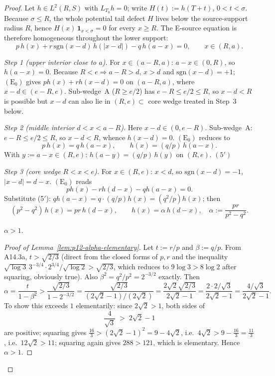 \begin{proof}
Let $h \in L^2(R, S)$ with $L_{T_0} h = 0$; write $H(t) := h(T + t)$,
$0 < t < \sigma$.  Because $\sigma \le R$, the whole potential tail
defect $H$ lives below the source-support radius $R$, hence
$H(x)\,\mathbf 1_{x < \sigma} = 0$ for every $x \ge R$.  The E-source
equation is therefore homogeneous throughout the lower support:
\[
p\, h(x) + r\, \mathrm{sgn}(x - d)\, h(|x - d|) - q\, h(a - x) = 0,
\qquad x \in (R, a).
\tag{E$_0$}
\]

\medskip
\noindent\emph{Step 1 (upper interior close to $a$).}
For $x \in (a - R, a)$: $a - x \in (0, R)$, so $h(a - x) = 0$.  Because
$R < e \Rightarrow a - R > d$, $x > d$ and $\mathrm{sgn}(x - d) = +1$;
$(\text{E}_0)$ gives $p h(x) + r h(x - d) = 0$ on $(a - R, a)$, where
$x - d \in (e - R, e)$.  Sub-wedge~A ($R \ge e/2$) has
$e - R \le e/2 \le R$, so $x - d < R$ is possible but $x - d$ can also
lie in $(R, e) \subset$ core wedge treated in Step~3 below.

\medskip
\noindent\emph{Step 2 (middle interior $d < x < a - R$).}
Here $x - d \in (0, e - R)$.  Sub-wedge~A: $e - R \le e/2 \le R$, so
$x - d < R$, whence $h(x - d) = 0$.  $(\text{E}_0)$ reduces to
\[
p\, h(x) = q\, h(a - x),\qquad h(x) = (q/p)\, h(a - x).
\tag{5}
\]
With $y := a - x \in (R, e)$: $h(a - y) = (q/p)\, h(y)$ on $(R, e)$.
\((\text{5}')\)

\medskip
\noindent\emph{Step 3 (core wedge $R < x < e$).}
For $x \in (R, e)$: $x < d$, so $\mathrm{sgn}(x - d) = -1$,
$|x - d| = d - x$.  $(\text{E}_0)$ reads
\[
p h(x) - r h(d - x) - q h(a - x) = 0.
\tag{E$_0$'}
\]
Substitute (5$'$): $q h(a - x) = q\cdot(q/p) h(x) = (q^2/p) h(x)$; then
\[
(p^2 - q^2)\, h(x) = p r\, h(d - x),
\qquad h(x) = \alpha\, h(d - x),
\quad \alpha := \frac{p r}{p^2 - q^2}.
\tag{6}
\]

\begin{lemma}\label{lem:p12-alpha-elementary}
$\alpha > 1$.
\end{lemma}
\begin{proof}[Proof of Lemma~\ref{lem:p12-alpha-elementary}]
Let $t := r/p$ and $\beta := q/p$.  From A14.3a, $t > \sqrt{2/3}$
(direct from the closed forms of $p, r$ and the inequality
$\sqrt{\log 3}\, 3^{-3/4} \cdot 2^{3/4}/\sqrt{\log 2} > \sqrt{2/3}$,
which reduces to $9\log 3 > 8\log 2$ after squaring, obviously true).
Also $\beta^2 = q^2/p^2 = 2^{-3/2}$ exactly.  Then
$$\alpha = \frac{t}{1 - \beta^2} > \frac{\sqrt{2/3}}{1 - 2^{-3/2}}
 = \frac{\sqrt{2/3}}{(2\sqrt 2 - 1)/(2\sqrt 2)}
 = \frac{2\sqrt{2}\sqrt{2/3}}{2\sqrt 2 - 1}
 = \frac{2\cdot 2/\sqrt 3}{2\sqrt 2 - 1}
 = \frac{4/\sqrt 3}{2\sqrt 2 - 1}.$$
To show this exceeds $1$ elementarily: since $2\sqrt 2 > 1$, both
sides of
$$
\frac{4}{\sqrt 3} \;>\; 2\sqrt 2 - 1
$$
are positive; squaring gives
$\tfrac{16}{3} > (2\sqrt 2 - 1)^{2} = 9 - 4\sqrt 2$, i.e.\
$4\sqrt 2 > 9 - \tfrac{16}{3} = \tfrac{11}{3}$, i.e.\
$12\sqrt 2 > 11$; squaring again gives $288 > 121$, which is
elementary.  Hence $\alpha > 1$.
\end{proof}


\end{proof}
